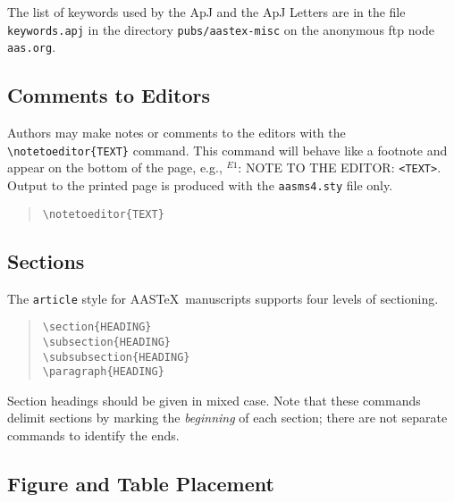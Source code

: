 The list of keywords used by the ApJ and the ApJ Letters are in the file 
{\tt keywords.apj} in the directory {\tt pubs/aastex-misc} on the anonymous
ftp node {\tt aas.org}.

\subsection{Comments to Editors}

Authors may make notes or comments to the editors with the
\verb"\notetoeditor{TEXT}" command.  This command will behave like a 
footnote and appear on the bottom of the page, e.g., $^{E1}$: {\small NOTE TO
THE EDITOR: \verb"<TEXT>"}.  Output to the printed page is produced with the 
\verb"aasms4.sty" file only.
\begin{quote}
\verb"\notetoeditor{TEXT}"
\end{quote}


\subsection{Sections}

The {\tt article} style for AAS\TeX\ manuscripts supports four levels of
sectioning.
\begin{quote}
\verb"\section{HEADING}"\\[.5ex]
\verb"\subsection{HEADING}"\\[.5ex]
\verb"\subsubsection{HEADING}"\\[.5ex]
\verb"\paragraph{HEADING}"
\end{quote}
Section headings should be given in mixed case.
Note that these commands delimit sections by marking the
{\sl beginning\/} of each section;
there are not separate commands to identify the ends.

\subsection{Figure and Table Placement}   \label{place}

